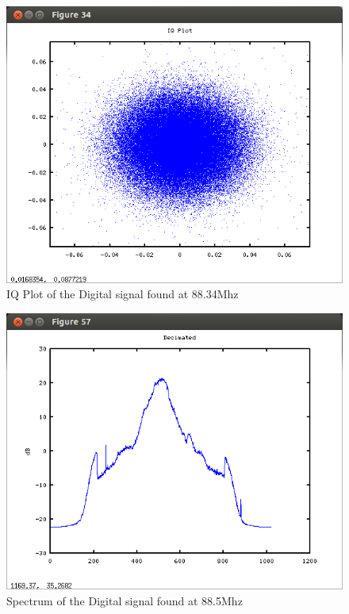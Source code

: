 \begin{figure}
\centering
\includegraphics[width=\linewidth]{../img/Report_IQ_Plot_Digital.png}
\caption{IQ Plot of the Digital signal found at 88.34Mhz}
\label{fig:digitalIQ}
\end{figure}

\begin{figure}
\centering
\includegraphics[width=\linewidth]{../img/Report_Decimated_FM_Signal.png}
\caption{Spectrum of the Digital signal found at 88.5Mhz}
\label{fig:FMSignal}
\end{figure}

